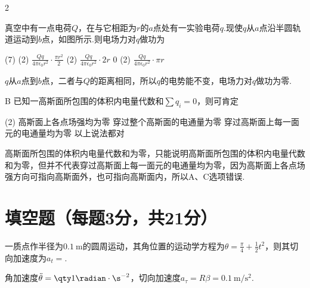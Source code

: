 \begin{paracol}{2}
\begin{problem}
    真空中有一点电荷$Q$，在与它相距为$r$的$a$点处有一实验电荷$q$.现使$q$从$a$点沿半圆轨道运动到$b$点，如图所示.则电场力对$q$做功为
    \begin{tasks}(7)
        \task*(2) $\displaystyle\frac{Qq}{4\pi\epsilon_0 r^2}\cdot\frac{\pi r^2}{2}$
        \task*(2) $\displaystyle\frac{Qq}{4\pi\epsilon_0 r^2}\cdot 2r$
        \task[\true] $0$
        \task*(2) $\displaystyle\frac{Qq}{4\pi\epsilon_0 r^2}\cdot\pi r$
    \end{tasks}
    \switchcolumn\vspace*{\fill}\centering
    \vspace*{\fill}
\end{problem}
\end{paracol}
\begin{solution}
    $q$从$a$点到$b$点，二者与$Q$的距离相同，所以$q$的电势能不变，电场力对$q$做功为零.
\end{solution}

\begin{problem}{B}
已知一高斯面所包围的体积内电量代数和$\sum{q_i}=0$，则可肯定
\begin{tasks}(2)
\task 高斯面上各点场强均为零
\task 穿过整个高斯面的电通量为零
\task 穿过高斯面上每一面元的电通量均为零
\task 以上说法都对
\end{tasks}
\end{problem}
\begin{solution}
    高斯面所包围的体积内电量代数和为零，只能说明高斯面所包围的体积内电量代数和为零，但并不代表穿过高斯面上每一面元的电通量均为零，因为高斯面上各点场强方向可指向高斯面外，也可指向高斯面内，所以A、C选项错误.
\end{solution}

\section{填空题（每题3分，共21分）}

\begin{problem}
一质点作半径为$\qty{0.1}\m$的圆周运动，其角位置的运动学方程为$\theta=\frac{\pi}{4}+\frac{1}{2}t^2$，则其切向加速度为$a_t=$.
\end{problem}
\begin{solution}
角加速度$\ddot\theta=\qty1{\radian\cdot\s^{-2}}$，切向加速度$a_\tau=R\beta=\qty{0.1}{\m/\s^2}$.
\end{solution}


